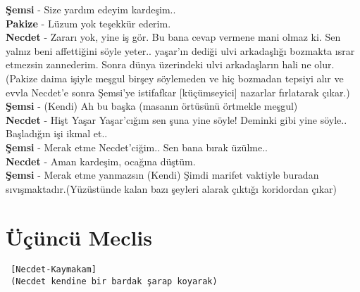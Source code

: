 \documentclass[]{book}
\begin{document}
\textbf{Şemsi} - Size yardım edeyim kardeşim..\\
\textbf{Pakize} - Lüzum yok teşekkür ederim.\\
\textbf{Necdet} - Zararı yok, yine iş gör. Bu bana cevap vermene mani olmaz ki. Sen yalnız beni affettiğini söyle yeter.. yaşar'ın dediği ulvi arkadaşlığı bozmakta ısrar etmezsin zannederim. Sonra dünya üzerindeki ulvi arkadaşların hali ne olur. (Pakize daima işiyle meşgul birşey söylemeden ve hiç bozmadan tepsiyi alır ve evvla Necdet'e sonra Şemsi'ye istifafkar {[}küçümseyici{]} nazarlar fırlatarak çıkar.)\\
\textbf{Şemsi} - (Kendi) Ah bu başka (masanın örtüsünü örtmekle meşgul)\\
\textbf{Necdet} - Hişt Yaşar Yaşar'cığım sen şuna yine söyle! Deminki gibi yine söyle.. Başladığın işi ikmal et..\\
\textbf{Şemsi} - Merak etme Necdet'ciğim.. Sen bana bırak üzülme..\\
\textbf{Necdet} - Aman kardeşim, ocağına düştüm.\\
\textbf{Şemsi} - Merak etme yanmazsın (Kendi) Şimdi marifet vaktiyle buradan sıvışmaktadır.(Yüzüstünde kalan bazı şeyleri alarak çıktığı koridordan çıkar)\\

\hypertarget{ucuncu-meclis-1}{%
\section{Üçüncü Meclis}\label{ucuncu-meclis-1}}

\begin{verbatim}
 [Necdet-Kaymakam]
 (Necdet kendine bir bardak şarap koyarak)
\end{verbatim}
\end{document}
